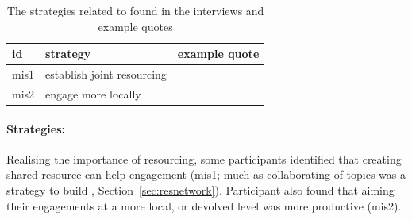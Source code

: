 \begin{table}[!ht]
\footnotesize
\caption{The strategies related to \ismmi{} found in the interviews and example quotes}\label{tab:resinfrastrat}
\begin{tabular}{L{.06\linewidth}L{.3\linewidth}L{.64\linewidth}} \hline
\textbf{id} & \textbf{strategy} & \textbf{example quote} \\ \hline \hline
mis1 & establish joint resourcing &  \\[5mm]
mis2 & engage more locally &  \\[5mm]
 \hline
 \end{tabular}
\end{table}

\paragraph{Strategies:}
Realising the importance of resourcing, some participants identified that creating shared resource can help engagement (mis1; much as collaborating of topics was a strategy to build \ismsnr{}, Section~\ref{sec:resnetwork}). Participant also found that aiming their engagements at a more local, or devolved level was more productive (mis2).

\subsubsection{\ismmo}\label{sec:resobjects}

